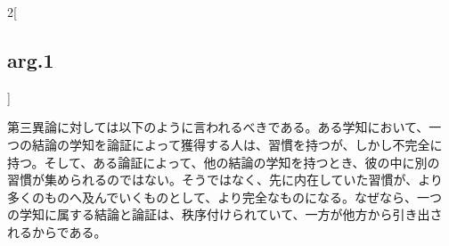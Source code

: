 \documentclass[paper=a4paper,fontsize=10pt,jafontsize=9pt,titlepage]{jlreq}
\begin{document}
\begin{paracol}{2}[\subsection{arg.1}]
\switchcolumn

第三異論に対しては以下のように言われるべきである。ある学知において、一
つの結論の学知を論証によって獲得する人は、習慣を持つが、しかし不完全に
持つ。そして、ある論証によって、他の結論の学知を持つとき、彼の中に別の
習慣が集められるのではない。そうではなく、先に内在していた習慣が、より
多くのものへ及んでいくものとして、より完全なものになる。なぜなら、一つ
の学知に属する結論と論証は、秩序付けられていて、一方が他方から引き出さ
れるからである。

\end{paracol}
\end{document}
